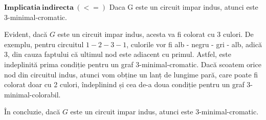 \documentclass{article}
\begin{document}
{$\mathbf{Implicatia\ indirecta\ (<=)}$ Daca G este un circuit impar indus, atunci este 3-minimal-cromatic.

Evident, dacă $G$ este un circuit impar indus, acesta va fi colorat cu 3 culori. De exemplu, pentru circuitul $1 - 2 - 3 - 1$, culorile vor fi alb - negru - gri - alb, adică 3, din cauza faptului că ultimul nod este adiacent cu primul. Astfel, este indeplinită prima condiție pentru un graf 3-minimal-cromatic. Dacă scoatem orice nod din circuitul indus, atunci vom obține un lanț de lungime pară, care poate fi colorat doar cu 2 culori, îndeplinind și cea de-a doua condiție pentru un graf 3-minimal-colorabil.

În concluzie, dacă $G$ este un circuit impar indus, atunci este 3-minimal-cromatic.

}
\end{document}
